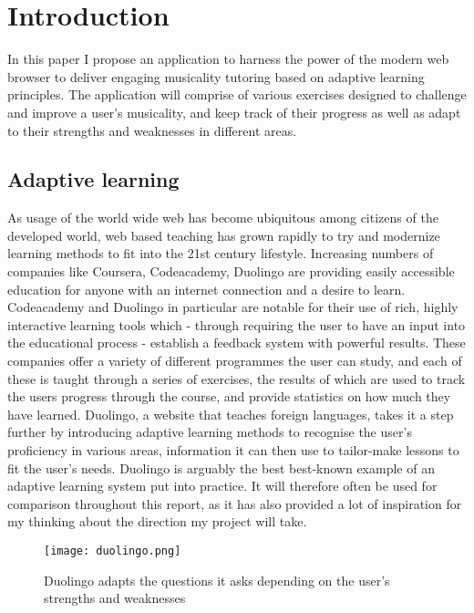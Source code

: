 \chapter{Introduction}

\par In this paper I propose an application to harness the power of the modern web browser to deliver engaging musicality tutoring based on adaptive learning principles. The application will comprise of various exercises designed to challenge and improve a user's musicality, and keep track of their progress as well as adapt to their strengths and weaknesses in different areas.
\vspace{1em}
\par

\section{Adaptive learning}
As usage of the world wide web has become ubiquitous among citizens of the developed world, web based teaching has grown rapidly to try and modernize learning methods to fit into the 21st century lifestyle. Increasing numbers of companies like Coursera\cite{coursera}, Codeacademy\cite{codeacademy}, Duolingo\cite{duolingo} are providing easily accessible education for anyone with an internet connection and a desire to learn. Codeacademy and Duolingo in particular are notable for their use of rich, highly interactive learning tools which - through requiring the user to have an input into the educational process - establish a feedback system with powerful results\cite{vesselinov2012duolingo}. These companies offer a variety of different programmes the user can study, and each of these is taught through a series of exercises, the results of which are used to track the users progress through the course, and provide statistics on how much they have learned. Duolingo, a website that teaches foreign languages, takes it a step further by introducing adaptive learning methods to recognise the user's proficiency in various areas, information it can then use to tailor-make lessons to fit the user's needs. Duolingo is arguably the best best-known example of an adaptive learning system put into practice. It will therefore often be used for comparison throughout this report, as it has also provided a lot of inspiration for my thinking about the direction my project will take.

\begin{figure}
	\centering
	\texttt{[image: duolingo.png]}
	\caption{Duolingo adapts the questions it asks depending on the user's strengths and weaknesses}
\end{figure}

